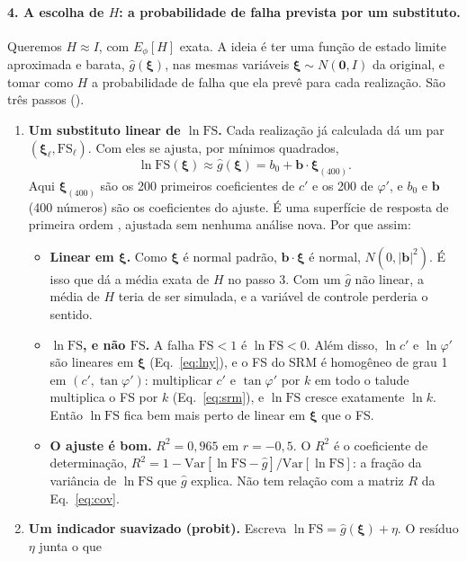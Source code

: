 \documentclass[11pt,a4paper]{article}
\newcommand{\xib}{\bm\xi}
\newcommand{\FS}{\mathrm{FS}}
\begin{document}
\paragraph{4. A escolha de $H$: a probabilidade de falha prevista por um substituto.} Queremos $H \approx I$, com
$E_\phi[H]$ exata. A ideia é ter uma função de estado limite aproximada e barata, $\hat g(\xib)$, nas mesmas variáveis
$\xib \sim N(\bm 0, I)$ da original, e tomar como $H$ a probabilidade de falha que ela prevê para cada realização. São três
passos ().
\begin{enumerate}
  \item \textbf{Um substituto linear de $\ln\FS$.} Cada realização já calculada dá um par $(\xib_\ell, \FS_\ell)$. Com
    eles se ajusta, por mínimos quadrados,
    \begin{equation}
      \ln\FS(\xib) \approx \hat g(\xib) = b_0 + \bm b\cdot\xib_{(400)}.
      \label{eq:surr}
    \end{equation}
    Aqui $\xib_{(400)}$ são os 200 primeiros coeficientes de $c'$ e os 200 de $\varphi'$, e $b_0$ e $\bm b$ (400 números)
    são os coeficientes do ajuste. É uma superfície de resposta de primeira ordem \citep{bucher1990}, ajustada sem
    nenhuma análise nova. Por que assim:
    \begin{itemize}
      \item \textbf{Linear em $\xib$.} Como $\xib$ é normal padrão, $\bm b\cdot\xib$ é normal, $N(0, |\bm b|^2)$. É isso
        que dá a média exata de $H$ no passo 3. Com um $\hat g$ não linear, a média de $H$ teria de ser simulada, e a
        variável de controle perderia o sentido.
      \item \textbf{$\ln\FS$, e não $\FS$.} A falha $\FS < 1$ é $\ln\FS < 0$. Além disso, $\ln c'$ e $\ln\varphi'$ são
        lineares em $\xib$ (Eq.~\ref{eq:lny}), e o FS do SRM é homogêneo de grau 1 em $(c', \tan\varphi')$:
        multiplicar $c'$ e $\tan\varphi'$ por $k$ em todo o talude multiplica o FS por $k$ (Eq.~\ref{eq:srm}), e
        $\ln\FS$ cresce exatamente $\ln k$. Então $\ln\FS$ fica bem mais perto de linear em $\xib$ que o FS.
      \item \textbf{O ajuste é bom.} $R^2 = 0{,}965$ em $r = -0{,}5$. O $R^2$ é o coeficiente de determinação,
        $R^2 = 1 - \mathrm{Var}[\ln\FS - \hat g]/\mathrm{Var}[\ln\FS]$: a fração da variância de $\ln\FS$ que $\hat g$
        explica. Não tem relação com a matriz $R$ da Eq.~\eqref{eq:cov}.
    \end{itemize}
  \item \textbf{Um indicador suavizado (probit).} Escreva $\ln\FS = \hat g(\xib) + \eta$. O resíduo $\eta$ junta o que

\end{enumerate}
\end{document}
